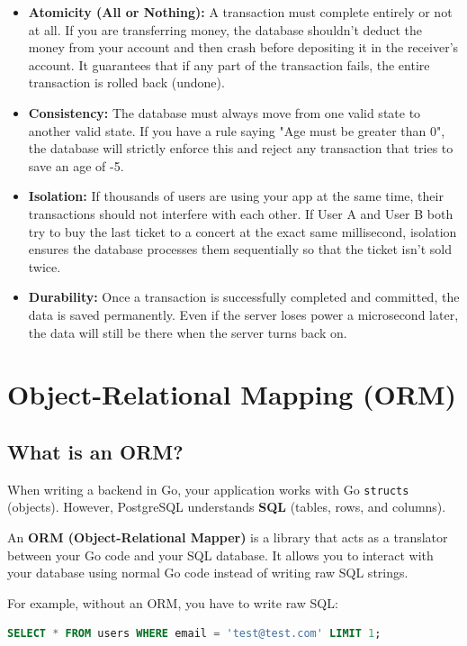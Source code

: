 \documentclass[11pt,a4paper]{article}
\begin{document}
\begin{itemize}
    \item \textbf{Atomicity (All or Nothing):} A transaction must complete entirely or not at all. If you are transferring money, the database shouldn't deduct the money from your account and then crash before depositing it in the receiver's account. It guarantees that if any part of the transaction fails, the entire transaction is rolled back (undone).
    \item \textbf{Consistency:} The database must always move from one valid state to another valid state. If you have a rule saying "Age must be greater than 0", the database will strictly enforce this and reject any transaction that tries to save an age of -5.
    \item \textbf{Isolation:} If thousands of users are using your app at the same time, their transactions should not interfere with each other. If User A and User B both try to buy the last ticket to a concert at the exact same millisecond, isolation ensures the database processes them sequentially so that the ticket isn't sold twice.
    \item \textbf{Durability:} Once a transaction is successfully completed and committed, the data is saved permanently. Even if the server loses power a microsecond later, the data will still be there when the server turns back on.
\end{itemize}

\section{Object-Relational Mapping (ORM)}
\subsection{What is an ORM?}
When writing a backend in Go, your application works with Go \texttt{structs} (objects). However, PostgreSQL understands \textbf{SQL} (tables, rows, and columns). 

An \textbf{ORM (Object-Relational Mapper)} is a library that acts as a translator between your Go code and your SQL database. It allows you to interact with your database using normal Go code instead of writing raw SQL strings.

For example, without an ORM, you have to write raw SQL:
\begin{lstlisting}[language=SQL]
SELECT * FROM users WHERE email = 'test@test.com' LIMIT 1;
\end{lstlisting}
\end{document}
